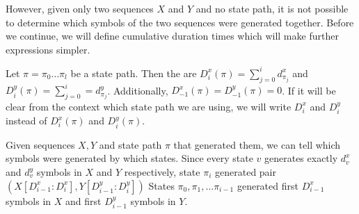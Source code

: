 However, given only two sequences $X$ and $Y$ and no state path, it is not
possible 
to determine which symbols of the two sequences were generated together. Before we
continue, we will define cumulative duration times which will make further
expressions simpler.

\begin{definition}
Let $\pi=\pi_0\dots\pi_l$ be a state path. Then the  are
$D^x_i(\pi)=\sum_{j=0}^{i}d^x_{\pi_j}$ and $D^y_i(\pi)=\sum_{j=0}^{i}=d^y_{\pi_j}$.
Additionally, $D^x_{-1}(\pi)=D^y_{-1}(\pi)=0$. If it will be clear from the context
which state path we are using, we will write $D^x_i$ and $D^y_i$ instead of
$D^x_i(\pi)$ and $D^y_i(\pi)$.
\end{definition}

Given sequences $X,Y$ and state path $\pi$ that generated them, we 
can tell which symbols were generated by which states. Since every state $v$
generates exactly $d^x_v$ and $d^y_v$ symbols in $X$ and $Y$ respectively,
state $\pi_i$ generated pair $(X[D^x_{i-1}:D^x_{i}],Y[D^y_{i-1}:D^y_{i}])$
States $\pi_0,\pi_1,\dots\pi_{i-1}$ generated first $D^x_{i-1}$ symbols in $X$
and first $D^y_{i-1}$ symbols in $Y$. 



